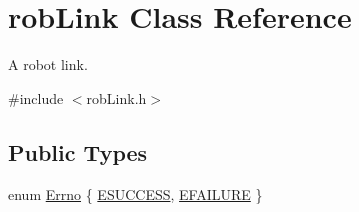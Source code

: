 \hypertarget{classrob_link}{\section{rob\-Link Class Reference}
\label{classrob_link}
}


A robot link.  




{\ttfamily \#include $<$rob\-Link.\-h$>$}

\subsection*{Public Types}
\begin{DoxyCompactItemize}
\item 
enum \hyperlink{classrob_link_aeafaa7aaa6cb47af0db3b746606c0bd0}{Errno} \{ \hyperlink{classrob_link_aeafaa7aaa6cb47af0db3b746606c0bd0a50ca3684acd35bf81c30fbb7d9fe5652}{E\-S\-U\-C\-C\-E\-S\-S}, 
\hyperlink{classrob_link_aeafaa7aaa6cb47af0db3b746606c0bd0a0506973f35ceab0b466f40856a327ca7}{E\-F\-A\-I\-L\-U\-R\-E}
 \}
\end{DoxyCompactItemize}
